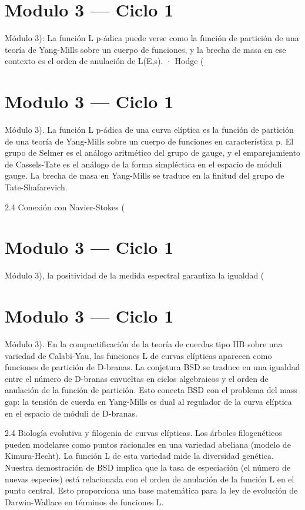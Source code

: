\documentclass[12pt,twoside]{book}
\begin{document}
\chapter{Modulo 3 — Ciclo 1}
Módulo 3): La función L p-ádica puede verse como la función de partición de una teoría de Yang-Mills sobre un cuerpo de funciones, y la brecha de masa en ese contexto es el orden de anulación de L(E,s).
· Hodge (

\chapter{Modulo 3 — Ciclo 1}
Módulo 3).
La función L p-ádica de una curva elíptica es la función de partición de una teoría de Yang-Mills sobre un cuerpo de funciones en característica p. El grupo de Selmer es el análogo aritmético del grupo de gauge, y el emparejamiento de Cassels-Tate es el análogo de la forma simpléctica en el espacio de móduli gauge. La brecha de masa en Yang-Mills se traduce en la finitud del grupo de Tate-Shafarevich.

2.4 Conexión con Navier-Stokes (

\chapter{Modulo 3 — Ciclo 1}
Módulo 3), la positividad de la medida espectral garantiza la igualdad (

\chapter{Modulo 3 — Ciclo 1}
Módulo 3).
En la compactificación de la teoría de cuerdas tipo IIB sobre una variedad de Calabi-Yau, las funciones L de curvas elípticas aparecen como funciones de partición de D-branas. La conjetura BSD se traduce en una igualdad entre el número de D-branas envueltas en ciclos algebraicos y el orden de anulación de la función de partición. Esto conecta BSD con el problema del mass gap: la tensión de cuerda en Yang-Mills es dual al regulador de la curva elíptica en el espacio de móduli de D-branas.

2.4 Biología evolutiva y filogenia de curvas elípticas.
Los árboles filogenéticos pueden modelarse como puntos racionales en una variedad abeliana (modelo de Kimura-Hecht). La función L de esta variedad mide la diversidad genética. Nuestra demostración de BSD implica que la tasa de especiación (el número de nuevas especies) está relacionada con el orden de anulación de la función L en el punto central. Esto proporciona una base matemática para la ley de evolución de Darwin-Wallace en términos de funciones L.
\end{document}
